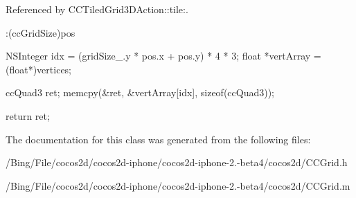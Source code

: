 Referenced by C\-C\-Tiled\-Grid3\-D\-Action\-::tile\-:.


\begin{DoxyCode}
              :(ccGridSize)pos
{
        NSInteger idx = (gridSize_.y * pos.x + pos.y) * 4 * 3;
        float *vertArray = (float*)vertices;

        ccQuad3 ret;
        memcpy(&ret, &vertArray[idx], sizeof(ccQuad3));

        return ret;
}
\end{DoxyCode}


The documentation for this class was generated from the following files\-:\begin{DoxyCompactItemize}
\item 
/\-Bing/\-File/cocos2d/cocos2d-\/iphone/cocos2d-\/iphone-\/2.-\/beta4/cocos2d/C\-C\-Grid.\-h\item 
/\-Bing/\-File/cocos2d/cocos2d-\/iphone/cocos2d-\/iphone-\/2.-\/beta4/cocos2d/C\-C\-Grid.\-m\end{DoxyCompactItemize}
